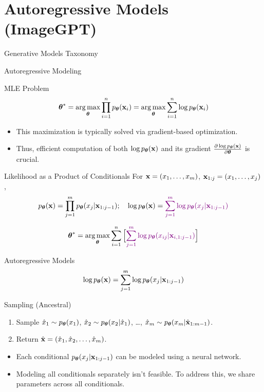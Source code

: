 \documentclass{beamer}
\begin{document}
\section{Autoregressive Models (ImageGPT)}
\begin{frame}{Generative Models Taxonomy}
\end{frame}
\begin{frame}{Autoregressive Modeling}
    \begin{block}{MLE Problem}
	    \vspace{-0.4cm}
	    $$
	        \boldsymbol{\theta}^* = \operatorname*{arg\,max}_{\boldsymbol{\theta}} \prod_{i=1}^n p_{\boldsymbol{\theta}}(\mathbf{x}_i) = \operatorname*{arg\,max}_{\boldsymbol{\theta}} \sum_{i=1}^n \log p_{\boldsymbol{\theta}}(\mathbf{x}_i)
	    $$
	    \vspace{-0.5cm}
    \end{block}
    \eqpause
    \begin{itemize}
        \item This maximization is typically solved via gradient-based optimization.
        \item Thus, efficient computation of both $\log p_{\boldsymbol{\theta}}(\mathbf{x})$ and its gradient $\frac{\partial \log p_{\boldsymbol{\theta}}(\mathbf{x})}{\partial \boldsymbol{\theta}}$ is crucial.
    \end{itemize}
    \eqpause
    \begin{block}{Likelihood as a Product of Conditionals}
    For $\mathbf{x} = (x_1, \dots, x_m)$, $\mathbf{x}_{1:j} = (x_1, \dots, x_j)$,
    $$
        p_{\boldsymbol{\theta}}(\mathbf{x}) = \prod_{j=1}^m p_{\boldsymbol{\theta}}(x_j | \mathbf{x}_{1:j - 1});\quad
        \log p_{\boldsymbol{\theta}}(\mathbf{x}) = {\color{violet}\sum_{j=1}^m \log p_{\boldsymbol{\theta}}(x_j | \mathbf{x}_{1:j - 1})}
    $$
    \end{block}
    \eqpause
    \vspace{-0.5cm}
	 $$
	     \boldsymbol{\theta}^* =  \operatorname*{arg\,max}_{\boldsymbol{\theta}} \sum_{i=1}^n \Big[{\color{violet} \sum_{j=1}^m \log p_{\boldsymbol{\theta}}(x_{ij} | \mathbf{x}_{i, 1:j - 1})}\Big]
	 $$
\end{frame}
\begin{frame}{Autoregressive Models}
    \[
    	\log p_{\boldsymbol{\theta}}(\mathbf{x}) = \sum_{j=1}^m \log p_{\boldsymbol{\theta}}(x_j | \mathbf{x}_{1:j - 1})
    \]
    \eqpause
    \begin{block}{Sampling (Ancestral)}
    	\begin{enumerate}
    		\item Sample $\hat{x}_1 \sim p_{\boldsymbol{\theta}}(x_1)$, $\hat{x}_2 \sim p_{\boldsymbol{\theta}}(x_2 | \hat{x}_1)$, \ldots, $\hat{x}_m \sim p_{\boldsymbol{\theta}}(x_m | \hat{\mathbf{x}}_{1:m-1})$.
    		\item Return $\hat{\mathbf{x}} = (\hat{x}_1, \hat{x}_2, \ldots, \hat{x}_m)$.
    	\end{enumerate}
    \end{block}
    \eqpause
    \begin{itemize}
        \item Each conditional $p_{\boldsymbol{\theta}}(x_j | \mathbf{x}_{1:j - 1})$ can be modeled using a neural network.
        \eqpause
        \item Modeling all conditionals separately isn't feasible. To address this, we share parameters across all conditionals.
    \end{itemize}
\end{frame}
\end{document}
